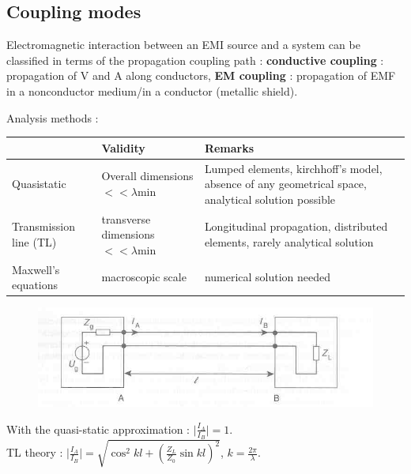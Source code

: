 \documentclass[../main.tex]{subfiles}
\begin{document}
\subsection{Coupling modes}
Electromagnetic interaction between an EMI source and a system can be classified in terms of the propagation coupling path : \textbf{conductive coupling} : propagation of V and A along conductors, \textbf{EM coupling} : propagation of EMF in a nonconductor medium/in a conductor (metallic shield). 

Analysis methods : \begin{table}[hbt!]
    \centering
    \begin{tabular}{p{}|p{}|p{}}
         & Validity & Remarks \\ \hline
        Quasistatic & Overall dimensions $<<\lambda$min & Lumped elements, kirchhoff's model, absence of any geometrical space, analytical solution possible\\ \hline
        Transmission line (TL) & transverse dimensions $<<\lambda$min & Longitudinal propagation, distributed elements, rarely analytical solution\\ \hline
        Maxwell's equations & macroscopic scale & numerical solution needed\\
    \end{tabular}
\end{table}

\begin{figure}[hbt!]
    \centering
    \includegraphics[width=0.5\linewidth]{IMAGES/Electromag/TLline.jpg}
\end{figure}

With the quasi-static approximation : $\lvert \frac{I_A}{I_B}\rvert = 1$.\\
TL theory : $\lvert \frac{I_A}{I_B}\rvert = \sqrt{\cos^2 kl + (\frac{Z_L}{Z_0} \sin kl)^2}$, $k=\frac{2\pi}{\lambda}$.\\
\end{document}
